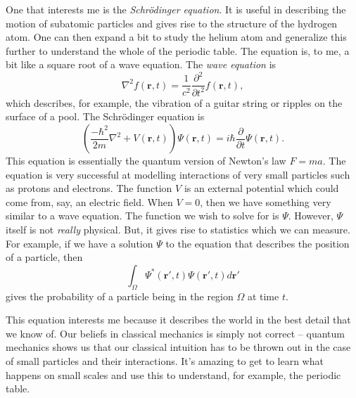 \documentclass[12pt]{article} %
\begin{document}
\begin{solution}
    One that interests me is the \emph{Schr\"odinger equation}. It is useful in describing the motion of subatomic particles and gives rise to the structure of the hydrogen atom.  One can then expand a bit to study the helium atom and generalize this further to understand the whole of the periodic table.  The equation is, to me, a bit like a square root of a wave equation. The \emph{wave equation} is
    \[
    \nabla^2 f(\mathbf{r},t) = \frac{1}{c^2}\frac{\partial^2}{\partial t^2}f(\mathbf{r},t),
    \]
    which describes, for example, the vibration of a guitar string or ripples on the surface of a pool. The Schr\"odinger equation is 
    \[
    \left( \frac{-\hbar^2}{2m}\nabla^2 + V(\mathbf{r},t)\right) \Psi(\mathbf{r},t) = i\hbar \frac{\partial}{\partial t}\Psi (\mathbf{r},t).
    \]
    This equation is essentially the quantum version of Newton's law $F=ma$. The equation is very successful at modelling interactions of very small particles such as protons and electrons.  The function $V$ is an external potential which could come from, say, an electric field. When $V=0$, then we have something very similar to a wave equation. The function we wish to solve for is $\Psi$. However, $\Psi$ itself is not \emph{really} physical.  But, it gives rise to statistics which we can measure.  For example, if we have a solution $\Psi$ to the equation that describes the position of a particle, then
    \[
    \int_\Omega \Psi^*(\mathbf{r}',t) \Psi(\mathbf{r}',t) d\mathbf{r}'
    \]
    gives the probability of a particle being in the region $\Omega$ at time $t$.

    This equation interests me because it describes the world in the best detail that we know of.  Our beliefs in classical mechanics is simply not correct -- quantum mechanics shows us that our classical intuition has to be thrown out in the case of small particles and their interactions.  It's amazing to get to learn what happens on small scales and use this to understand, for example, the periodic table.
\end{solution}

\newpage
\end{document}
